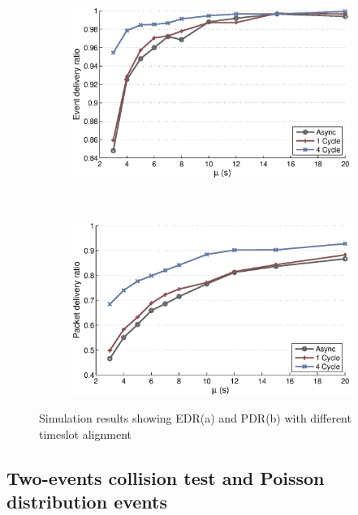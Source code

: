 \begin{figure}[p]
    \centering
    \begin{subfigure}[t]{0.8\textwidth}
        \centering
        \includegraphics[width=\textwidth] {../../sw/pc/matlab/simulation-result/slotting-edr-250evt.eps}
        \caption{}
    \end{subfigure} 
    \\
    \begin{subfigure}[t]{0.8\textwidth}
        \centering
        \includegraphics[width=\textwidth] {../../sw/pc/matlab/simulation-result/slotting-pdr-250evt.eps}
        \caption{}
    \end{subfigure}
    \caption[EDR and PDR with different timeslot alignment]{Simulation results showing EDR(a) and PDR(b) with different timeslot alignment}\label{fig:edr-pdr-slotting}
\end{figure}

\subsection{Two-events collision test and Poisson distribution events}

